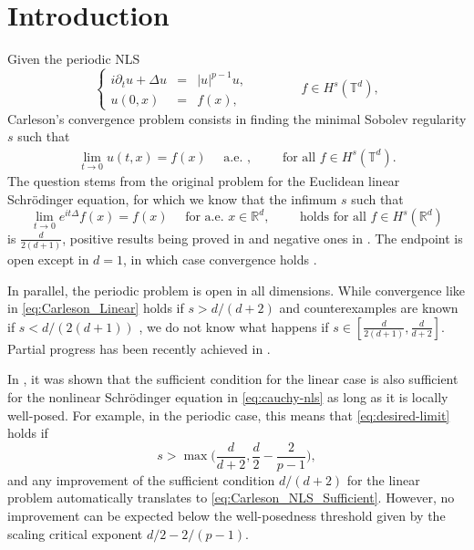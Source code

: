 \documentclass[11pt, xcolor = dvipsnames,reqno
]{amsart}
\theoremstyle{definition}
\theoremstyle{remark}
\begin{document}
\section{Introduction}
\noindent
Given the periodic NLS
\begin{equation}\label{eq:cauchy-nls}
		\left\{
		\begin{array}{rcl}
			i\partial_t u + \Delta u & = & |u|^{p-1} u, 
			\\
			u(0,x) & = & f(x),
		\end{array}
        \qquad \qquad 
        f \in H^s(\mathbb T^d),
		\right.
	\end{equation}
    Carleson's convergence problem consists in finding the minimal Sobolev regularity $s$ such that
    \begin{align}\label{eq:desired-limit}
        \lim_{t \to 0} u(t,x) = f(x)
        \quad \text { a.e. }, 
        \qquad 
        \text{ for all } f \in H^s(\mathbb T^d).
    \end{align}
%
    The question stems from the original problem for the Euclidean linear Schr\"odinger equation,  
    for which we know that the infimum $s$ such that
    \begin{equation}\label{eq:Carleson_Linear}
        \lim_{t \to 0} e^{it\Delta}f(x) = f(x)
        \quad \text { for a.e. } x \in \mathbb R^d, 
        \qquad \text{ holds for all } f \in H^s(\mathbb R^d)
    \end{equation}
    is $\frac{d}{2(d+1)}$, 
    positive results being proved in \cite{Carleson1980,DGL2017,DuZhang2019} and negative ones in \cite{DahlbergKenig1982,Bourgain2016}. 
    The endpoint is open except in $d=1$, in which case convergence holds \cite{Carleson1980}.
    
    In parallel, 
    the periodic problem is open in all dimensions. 
    While convergence like in \eqref{eq:Carleson_Linear} holds if $s > d/(d+2)$  \cite{MoyuaVega2008,WangZhang2019,CLS2020} and counterexamples are known if $s < d/(2(d+1))$ \cite{CLS2020,EceizabarrenaLuca2022}, 
    we do not know what happens if $s \in [\frac{d}{2(d+1)} , \frac{d}{d+2}]$. 
    Partial progress has been recently achieved in \cite{Barron2022,MYZ2023,Demeter2025}. 

    In \cite{CLS2020}, it was shown that the sufficient condition for the linear case is also sufficient for the nonlinear Schr\"odinger equation in \eqref{eq:cauchy-nls} as long as it is locally well-posed. 
    For example, in the periodic case, this means that \eqref{eq:desired-limit} holds if 
    \begin{equation}\label{eq:Carleson_NLS_Sufficient}
        s > \max \Big( \frac{d}{d+2}, \frac{d}{2} - \frac{2}{p-1} \Big),  
    \end{equation}
    and any improvement of the sufficient condition $d/(d+2)$ for the linear problem automatically translates to \eqref{eq:Carleson_NLS_Sufficient}.
    However, no improvement can be expected below the well-posedness threshold given by the scaling critical exponent $d/2 - 2/(p-1)$. 
    
\end{document}
